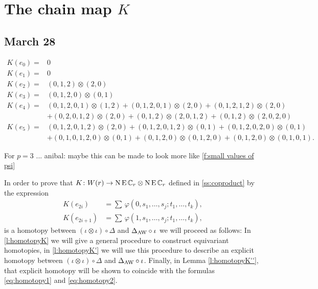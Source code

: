 
\appendix
\newpage
\section{The chain map $K$}\label{s:chain homotopy K}

\subsection{March 28}

\begin{table}
	\begin{align*}
		K(e_0) =& 0 \\
		K(e_1) =& 0 \\
		K(e_2) =& (0,1,2)\otimes(2,0) \\
		K(e_3) =& (0,1,2,0)\otimes (0,1) \\
		K(e_4) =& (0,1,2,0,1)\otimes (1,2) + (0,1,2,0,1)\otimes (2,0) + (0,1,2,1,2)\otimes(2,0)  \\
		&+ (0,2,0,1,2)\otimes(2,0) + (0,1,2)\otimes (2,0,1,2) + (0,1,2)\otimes (2,0,2,0) \\
		K(e_5) =& (0,1,2,0,1,2)\otimes (2,0) + (0,1,2,0,1,2)\otimes (0,1) + (0,1,2,0,2,0)\otimes(0,1)  \\
		&+ (0,1,0,1,2,0)\otimes(0,1) + (0,1,2,0)\otimes (0,1,2,0) + (0,1,2,0)\otimes (0,1,0,1).
	\end{align*}
	\caption{For $p=3$ ... anibal: maybe this can be made to look more like \cref{f:small values of psi}}
\end{table}

In order to prove that $K \colon W(r) \to \operatorname{N}\operatorname{E}\mathbb{C}_r \otimes \operatorname{N}\operatorname{E}\mathbb{C}_r$ defined in \cref{ss:coproduct} by the expression
\begin{align}
	\label{eq:homotopy1}
	K(e_{2i})   &= \sum \, \varphi(0,s_1,\dots,s_j;t_1,\dots,t_k), \\
	\label{eq:homotopy2}
	K(e_{2i+1}) &= \sum \, \varphi(1,s_1,\dots,s_j;t_1,\dots,t_k),
\end{align}
is a homotopy between $(\iota\otimes \iota)\circ \Delta$ and $\Delta_{\operatorname{AW}}\circ \iota$ we will proceed as follows: In \cref{l:homotopyK} we will give a general procedure to construct equivariant homotopies, in \cref{l:homotopyK'} we will use this procedure to describe an explicit homotopy between $(\iota\otimes \iota)\circ \Delta$ and $\Delta_{\operatorname{AW}}\circ \iota$. Finally, in Lemma \ref{l:homotopyK''}, that explicit homotopy will be shown to coincide with the formulas \eqref{eq:homotopy1} and \eqref{eq:homotopy2}.


